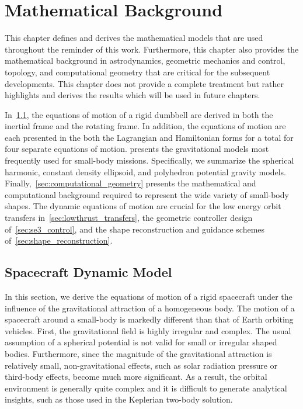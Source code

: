 
\chapter{Mathematical Background}\label{sec:mathematical_background}
This chapter defines and derives the mathematical models that are used throughout the reminder of this work.
Furthermore, this chapter also provides the mathematical background in astrodynamics, geometric mechanics and control, topology, and computational geometry that are critical for the subsequent developments.
This chapter does not provide a complete treatment but rather highlights and derives the results which will be used in future chapters.

In~\cref{sec:dumbbell}, the equations of motion of a rigid dumbbell are derived in both the inertial frame and the rotating frame.
In addition, the equations of motion are each presented in the both the Lagrangian and Hamiltonian forms for a total for four separate equations of motion.
 presents the gravitational models most frequently used for small-body missions. 
Specifically, we summarize the spherical harmonic, constant density ellipsoid, and polyhedron potential gravity models.
Finally,~\cref{sec:computational_geometry} presents the mathematical and computational background required to represent the wide variety of small-body shapes.
The dynamic equations of motion are crucial for the low energy orbit transfers in~\cref{sec:lowthrust_transfers}, the geometric controller design of~\cref{sec:se3_control}, and the shape reconstruction and guidance schemes of~\cref{sec:shape_reconstruction}.

\section{Spacecraft Dynamic Model}\label{sec:dumbbell}

In this section, we derive the equations of motion of a rigid spacecraft under the influence of the gravitational attraction of a homogeneous body.
The motion of a spacecraft around a small-body is markedly different than that of Earth orbiting vehicles.
First, the gravitational field is highly irregular and complex. 
The usual assumption of a spherical potential is not valid for small or irregular shaped bodies.
Furthermore, since the magnitude of the gravitational attraction is relatively small, non-gravitational effects, such as solar radiation pressure or third-body effects, become much more significant.
As a result, the orbital environment is generally quite complex and it is difficult to generate analytical insights, such as those used in the Keplerian two-body solution.

